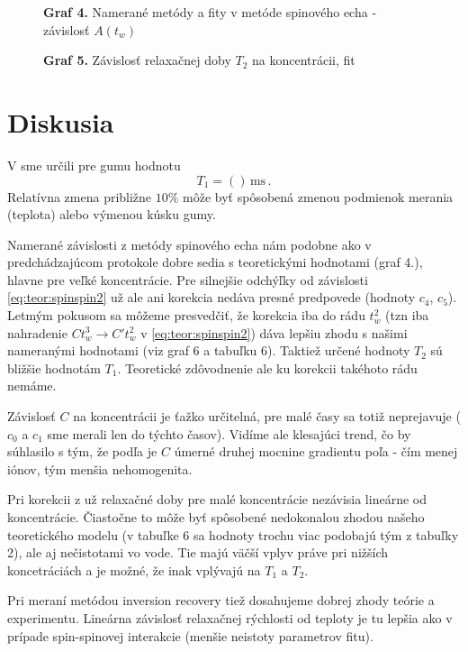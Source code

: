 \documentclass[a4paper, 10pt]{article}
\newcommand{\unit}[1]{\ensuremath{\, \mathrm{#1}}}
\begin{document}
\begin{figure}[t]
\centering
\vspace*{-15pt}

\textbf{Graf 4.} Namerané metódy a fity v metóde spinového echa - závislosť $A(t_w)$
\end{figure}


\begin{figure}[t]
\centering
\vspace*{-15pt}

\textbf{Graf 5.} Závislosť relaxačnej doby $T_2$ na koncentrácii, fit   
\end{figure}


\section*{Diskusia}
V \cite{predch} sme určili pre gumu hodnotu 
$$ T_1 = () \unit{ms}\,.$$
Relatívna zmena približne $10\%$ môže byť spôsobená zmenou podmienok merania (teplota) alebo výmenou kúsku gumy.

Namerané závislosti z metódy spinového echa nám podobne ako v predchádzajúcom protokole dobre sedia s teoretickými hodnotami (graf 4.), hlavne pre veľké koncentrácie. Pre silnejšie odchýľky od závislosti \ref{eq:teor:spinspin2} už ale ani korekcia nedáva presné predpovede (hodnoty $c_4$, $c_5$). Letmým pokusom sa môžeme presvedčiť, že korekcia iba do rádu $t_w^2$ (tzn iba nahradenie $Ct_w^3\to C't_w^2$ v \ref{eq:teor:spinspin2}) dáva lepšiu zhodu s našimi nameranými hodnotami (viz graf 6 a tabuľku 6). Taktiež určené hodnoty $T_2$ sú bližšie hodnotám $T_1$. Teoretické zdôvodnenie ale ku korekcii takéhoto rádu nemáme.

Závislosť $C$ na koncentrácii je ťažko určitelná, pre malé časy sa totiž neprejavuje ($c_0$ a $c_1$ sme merali len do týchto časov). Vidíme ale klesajúci  trend, čo by súhlasilo s tým, že podľa \cite{rozs} je $C$ úmerné druhej mocnine gradientu poľa - čím menej iónov, tým menšia nehomogenita.

Pri korekcii z \cite{rozs} už relaxačné doby pre malé koncentrácie nezávisia lineárne od koncentrácie. Čiastočne to môže byť spôsobené nedokonalou zhodou našeho teoretického modelu (v tabuľke 6 sa hodnoty trochu viac podobajú tým z tabuľky 2), ale aj nečistotami vo vode. Tie majú väčší vplyv práve pri nižších koncetráciách a je možné, že inak vplývajú na $T_1$ a $T_2$. 

Pri meraní metódou inversion recovery tiež dosahujeme dobrej zhody teórie a experimentu. Lineárna závislosť relaxačnej rýchlosti od teploty je tu lepšia ako v prípade spin-spinovej interakcie (menšie neistoty parametrov fitu). 
\end{document}
